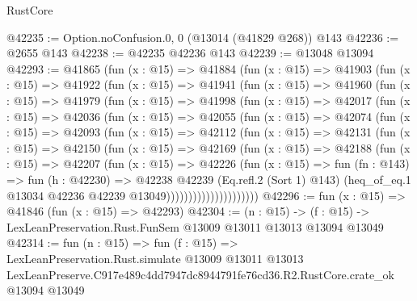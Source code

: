 \begin{lexlean}{RustCore}
\begin{coremodule}
@42235 := Option.noConfusion.{0, 0} (@13014 (@41829 @268)) @143
@42236 := @2655 @143
@42238 := @42235 @42236 @143
@42239 := @13048 @13094
@42293 := @41865
    (fun (x : @15) =>
    @41884
      (fun (x : @15) =>
      @41903
        (fun (x : @15) =>
        @41922
          (fun (x : @15) =>
          @41941
            (fun (x : @15) =>
            @41960
              (fun (x : @15) =>
              @41979
                (fun (x : @15) =>
                @41998
                  (fun (x : @15) =>
                  @42017
                    (fun (x : @15) =>
                    @42036
                      (fun (x : @15) =>
                      @42055
                        (fun (x : @15) =>
                        @42074
                          (fun (x : @15) =>
                          @42093
                            (fun (x : @15) =>
                            @42112
                              (fun (x : @15) =>
                              @42131
                                (fun (x : @15) =>
                                @42150
                                  (fun (x : @15) =>
                                  @42169
                                    (fun (x : @15) =>
                                    @42188
                                      (fun (x : @15) =>
                                      @42207
                                        (fun (x : @15) =>
                                        @42226
                                          (fun (x : @15) =>
                                          fun (fn : @143) =>
                                          fun (h : @42230) =>
                                          @42238
                                            @42239
                                            (Eq.refl.{2} (Sort 1) @143)
                                            (heq_of_eq.{1}
                                              @13034
                                              @42236
                                              @42239
                                              @13049)))))))))))))))))))))
@42296 := fun (x : @15) => @41846 (fun (x : @15) => @42293)
@42304 := (n : @15) ->
  (f : @15) -> LexLeanPreservation.Rust.FunSem @13009 @13011 @13013 @13094 @13049
@42314 := fun (n : @15) =>
  fun (f : @15) =>
  LexLeanPreservation.Rust.simulate
    @13009
    @13011
    @13013
    LexLeanPreserve.C917e489c4dd7947dc8944791fe76cd36.R2.RustCore.crate_ok
    @13094
    @13049
\end{coremodule}
\end{lexlean}
